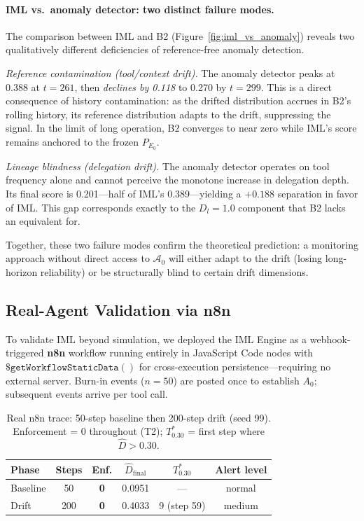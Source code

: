 \documentclass[11pt]{article}
\newcommand{\Azero}{\mathcal{A}_0}
\newcommand{\Dhat}{\widehat{D}}
\begin{document}
\paragraph{IML vs.\ anomaly detector: two distinct failure modes.}
The comparison between IML and B2 (Figure~\ref{fig:iml_vs_anomaly}) reveals
two qualitatively different deficiencies of reference-free anomaly detection.

\emph{Reference contamination (tool/context drift).}  The anomaly detector
peaks at 0.388 at $t=261$, then \emph{declines by 0.118} to 0.270 by
$t=299$.  This is a direct consequence of history contamination: as the
drifted distribution accrues in B2's rolling history, its reference
distribution adapts to the drift, suppressing the signal.  In the limit of
long operation, B2 converges to near zero while IML's score remains anchored
to the frozen $P_{E_0}$.

\emph{Lineage blindness (delegation drift).}  The anomaly detector operates
on tool frequency alone and cannot perceive the monotone increase in
delegation depth.  Its final score is 0.201---half of IML's 0.389---yielding
a $+0.188$ separation in favor of IML.  This gap corresponds exactly to the
$D_l = 1.0$ component that B2 lacks an equivalent for.

Together, these two failure modes confirm the theoretical prediction:
a monitoring approach without direct access to $\Azero$ will either adapt
to the drift (losing long-horizon reliability) or be structurally blind to
certain drift dimensions.

\subsection{Real-Agent Validation via n8n}
\label{sec:real_traces}

To validate IML beyond simulation, we deployed the IML Engine as a
webhook-triggered \textbf{n8n} workflow running entirely in JavaScript Code
nodes with $\$\mathtt{getWorkflowStaticData()}$ for cross-execution
persistence---requiring no external server.  Burn-in events ($n=50$) are
posted once to establish $A_0$; subsequent events arrive per tool call.

\begin{table}[h]
\centering
\caption{Real n8n trace: 50-step baseline then 200-step drift (seed 99).
         Enforcement = 0 throughout (T2); $T^*_{0.30}$ = first step where
         $\Dhat > 0.30$.}
\label{tab:real}
\small
\begin{tabular}{@{}lccccc@{}}
\toprule
Phase & Steps & Enf. & $\Dhat_{\text{final}}$ & $T^*_{0.30}$ & Alert level \\
\midrule
Baseline  & 50  & \textbf{0} & 0.0951 & --- & normal \\
Drift     & 200 & \textbf{0} & 0.4033 & 9 (step 59) & medium \\
\bottomrule
\end{tabular}
\end{table}
\end{document}
